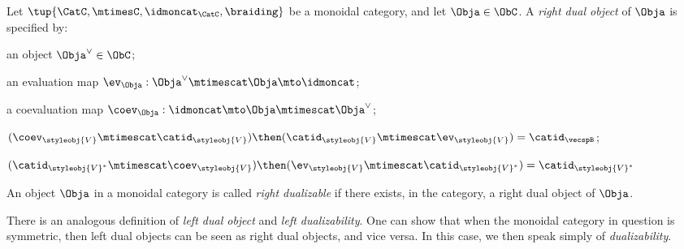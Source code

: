 \begin{ctdefinition}\label{def:dualizable-object}
Let $\tup{\CatC,\mtimesC,\idmoncat_{\CatC}, \braiding}$ be a monoidal category, and let $\Obja \in \ObC$. A \emph{right dual object} of $\Obja$ is specified by:

\constit
\begin{compactenum}
\item an object $\Obja^\vee \in \ObC$;
\item an evaluation map $\ev_\Obja: \Obja^\vee \mtimescat \Obja \mto \idmoncat$; 
\item a coevaluation map $\coev_\Obja: \idmoncat \mto \Obja \mtimescat \Obja^\vee$;
\end{compactenum}

\condit
\begin{compactenum}
\item $(\coev_\styleobj{V} \mtimescat \catid_\styleobj{V}) \then (\catid_\styleobj{V} \mtimescat \ev_\styleobj{V}) = \catid_\vecspB$; 

\item $(\catid_{\styleobj{V}^*} \mtimescat \coev_\styleobj{V})  \then (\ev_\styleobj{V} \mtimescat \catid_{\styleobj{V}^*})  = \catid_{\styleobj{V}^*}$

\end{compactenum}
\end{ctdefinition}

\begin{definition}
An object $\Obja$ in a monoidal category is called \emph{right dualizable} if there exists, in the category, a right dual object of $\Obja$. 
\end{definition}

\begin{remark}
There is an analogous definition of \emph{left dual object} and \emph{left dualizability}. One can show that when the monoidal category in question is symmetric, then left dual objects can be seen as right dual objects, and vice versa. In this case, we then speak simply of \emph{dualizability}. 
\end{remark}



